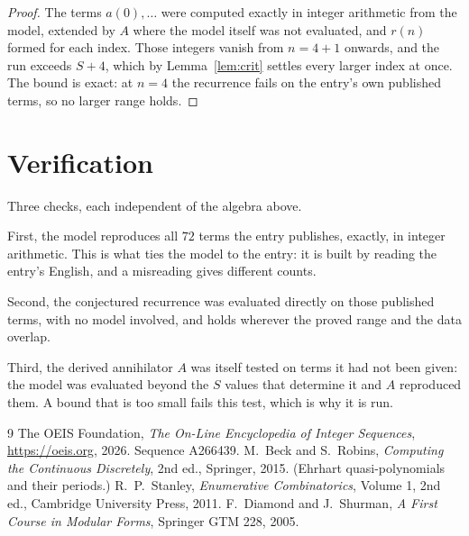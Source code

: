 \documentclass[11pt,a4paper]{article}
\theoremstyle{plain}
\theoremstyle{definition}
\begin{document}
\begin{proof}
The terms $a(0),\dots$ were computed exactly in integer arithmetic from the model, extended by
$A$ where the model itself was not evaluated, and $r(n)$ formed for each index. Those integers
vanish from $n=4+1$ onwards, and the run exceeds $S+4$, which by
Lemma~\ref{lem:crit} settles every larger index at once. The bound is exact: at $n=4$ the recurrence fails on the entry's own published terms, so no larger range holds.
\end{proof}

\section{Verification}

Three checks, each independent of the algebra above.

First, the model reproduces all $72$ terms the entry publishes, exactly, in integer
arithmetic. This is what ties the model to the entry: it is built by reading the entry's
English, and a misreading gives different counts.

Second, the conjectured recurrence was evaluated directly on those published terms, with no
model involved, and holds wherever the proved range and the data overlap.

Third, the derived annihilator $A$ was itself tested on terms it had not been given: the model
was evaluated beyond the $S$ values that determine it and $A$ reproduced them. A bound that is
too small fails this test, which is why it is run.

\begin{thebibliography}{9}
 The OEIS Foundation, \emph{The On-Line Encyclopedia of Integer
Sequences}, \url{https://oeis.org}, 2026. Sequence A266439.
 M.~Beck and S.~Robins, \emph{Computing the Continuous Discretely},
2nd ed., Springer, 2015. (Ehrhart quasi-polynomials and their periods.)
 R.~P.~Stanley, \emph{Enumerative Combinatorics}, Volume 1, 2nd ed.,
Cambridge University Press, 2011.
 F.~Diamond and J.~Shurman, \emph{A First Course in Modular Forms},
Springer GTM 228, 2005.
\end{thebibliography}
\end{document}
